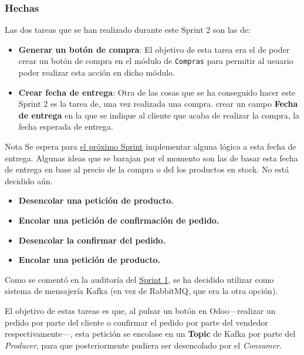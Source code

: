 \documentclass[12pt, a4paper, twoside]{article} %
\newcommand{\B}[1]{\textbf{#1}}
\newcommand{\ti}{\emph} %
\newcommand{\ul}{\underline}
\begin{document}
\subsubsection{Hechas}
Las dos tareas que se han realizado durante este Sprint 2 son las de:
\begin{itemize}
    \item \B{Generar un botón de compra}: El objetivo de esta tarea era el de poder crear un botón de compra en el módulo de \texttt{Compras} para permitir al usuario poder realizar esta acción en dicho módulo.
    
    \item \B{Crear fecha de entrega}: Otra de las cosas que se ha conseguido hacer este Sprint 2 es la tarea de, una vez realizada una compra. crear un campo \B{Fecha de entrega} en la que se indique al cliente que acaba de realizar la compra, la fecha esperada de entrega. 

\end{itemize}
\begin{ejemplo}{Nota}
    Se espera para \ul{el próximo Sprint} implementar alguna lógica a esta fecha de entrega. Algunas ideas que se barajan por el momento son las de basar esta fecha de entrega en base al precio de la compra o del los productos en stock. No está decidido aún.
\end{ejemplo}
\begin{itemize}
    \item \B{Desencolar una petición de producto.}
    
    \item \B{Encolar una petición de confirmación de pedido.}
    
    \item \B{Desencolar la confirmar del pedido.} 
    
    \item \B{Encolar una petición de producto.}
\end{itemize}

Como se comentó en la auditoría del \ul{Sprint 1}, se ha decidido utilizar como sistema de mensajería Kafka (en vez de RabbitMQ, que era la otra opción). 

El objetivo de estas tareas es que, al pulsar un botón en Odoo---realizar un pedido por parte del cliente o confirmar el pedido por parte del vendedor respectivamente---, esta petición se encolase en un \B{Topic} de Kafka por parte del \ti{Producer}, para que posteriormente pudiera ser desencolado por el \ti{Consumer}.
\end{document}

